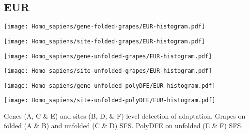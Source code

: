 \documentclass{article}
\begin{document}
\subsection{EUR}
\centering
\begin{minipage}{0.49\linewidth}
    \texttt{[image: Homo\_sapiens/gene-folded-grapes/EUR-histogram.pdf]}
\end{minipage}%
\hfill
\begin{minipage}{0.49\linewidth}
    \texttt{[image: Homo\_sapiens/site-folded-grapes/EUR-histogram.pdf]}
\end{minipage}
\hfill
\begin{minipage}{0.49\linewidth}
    \texttt{[image: Homo\_sapiens/gene-unfolded-grapes/EUR-histogram.pdf]}
\end{minipage}%
\hfill
\begin{minipage}{0.49\linewidth}
    \texttt{[image: Homo\_sapiens/site-unfolded-grapes/EUR-histogram.pdf]}
\end{minipage}
\hfill
\begin{minipage}{0.49\linewidth}
    \texttt{[image: Homo\_sapiens/gene-unfolded-polyDFE/EUR-histogram.pdf]}
\end{minipage}%
\hfill
\begin{minipage}{0.49\linewidth}
    \texttt{[image: Homo\_sapiens/site-unfolded-polyDFE/EUR-histogram.pdf]}
\end{minipage}
\hfill
\flushleft
Genes (A, C \& E) and sites (B, D, \& F) level detection of adaptation.
Grapes on folded (A \& B) and unfolded (C \& D) SFS.
PolyDFE on unfolded (E \& F) SFS.

\pagebreak
\end{document}
